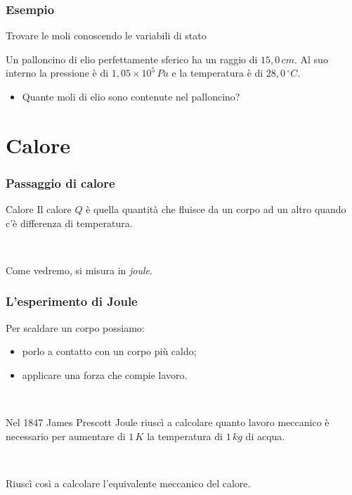 \documentclass[]{beamer}
\theoremstyle{plain}
\begin{document}
\begin{frame}
\frametitle{Esempio}
\begin{exampleblock}{Trovare le moli conoscendo le variabili di stato}
{\small Un palloncino di elio perfettamente sferico ha un raggio di $ 15,0 \, cm $. Al suo interno la pressione è di $ 1,05 \times 10^5 \, Pa $ e la temperatura è di $ 28,0 \, ^\circ C $.
\begin{itemize}
  \item Quante moli di elio sono contenute nel palloncino?
\end{itemize}}
\end{exampleblock}
\end{frame}


\section{Calore}

\begin{frame}
\frametitle{Passaggio di calore}
\begin{block}{Calore}
Il calore $ Q $ è quella quantità che fluisce da un corpo ad un altro quando c'è differenza di temperatura.\pause

~

Come vedremo, si misura in \emph{joule}.
\end{block}
\end{frame}

\begin{frame}
\frametitle{L'esperimento di Joule}
Per scaldare un corpo possiamo:
\begin{itemize}
  \item porlo a contatto con un corpo più caldo;\pause
  \item applicare una forza che compie lavoro.\pause
\end{itemize}

~

Nel 1847 James Prescott Joule riuscì a calcolare quanto \alert<3>{lavoro meccanico} è necessario per aumentare di $ 1\, K $ la temperatura di $ 1 \, kg $ di acqua.\pause

~

Riuscì così a calcolare l'\alert<4>{equivalente meccanico del calore}.
\end{frame}
\end{document}
